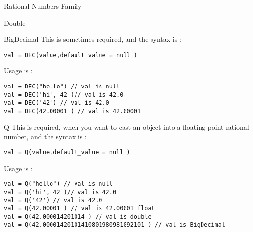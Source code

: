 \begin{section}{Rational Numbers Family}
\begin{subsection}{Double}
\end{subsection}

\begin{subsection}{BigDecimal}
This is sometimes required, and the syntax is :

\begin{lstlisting}[style=JexlStyle]
val = DEC(value,default_value = null )
\end{lstlisting}

Usage is :
\begin{center}\begin{minipage}{\linewidth}
\begin{lstlisting}[style=JexlStyle]
val = DEC("hello") // val is null
val = DEC('hi', 42 )// val is 42.0
val = DEC('42') // val is 42.0 
val = DEC(42.00001 ) // val is 42.00001
\end{lstlisting}
\end{minipage}\end{center}
\end{subsection}

\begin{subsection}{Q}
This is required, when you want to cast
an object into a floating point rational number, 
and the syntax is :

\begin{lstlisting}[style=JexlStyle]
val = Q(value,default_value = null )
\end{lstlisting}

Usage is :
\begin{center}\begin{minipage}{\linewidth}
\begin{lstlisting}[style=JexlStyle]
val = Q("hello") // val is null
val = Q('hi', 42 )// val is 42.0
val = Q('42') // val is 42.0 
val = Q(42.00001 ) // val is 42.00001 float 
val = Q(42.000014201014 ) // val is double 
val = Q(42.00001420101410801980981092101 ) // val is BigDecimal 
\end{lstlisting}
\end{minipage}\end{center}
\end{subsection}
\end{section}


